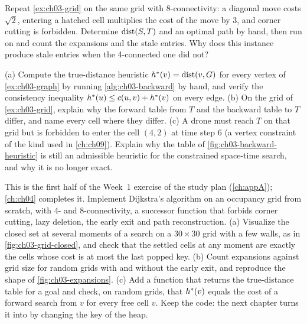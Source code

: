 \begin{exercise}[\difficulty{2}]
\label{exr:ch03-grid8}
Repeat \cref{ex:ch03-grid} on the same grid with 8-connectivity: a diagonal move costs $\sqrt2$,
entering a hatched cell multiplies the cost of the move by 3, and corner cutting is forbidden.
Determine $\operatorname{dist}(S,T)$ and an optimal path by hand, then run  on
 and count the expansions and the stale entries. Why does this
instance produce stale entries when the 4-connected one did not?
\end{exercise}

\begin{exercise}[\difficulty{2}]
\label{exr:ch03-backward}
(a) Compute the true-distance heuristic $h^*(v)=\operatorname{dist}(v,G)$ for every vertex of
\cref{ex:ch03-graph} by running \cref{alg:ch03-backward} by hand, and verify the consistency
inequality $h^*(u)\le c(u,v)+h^*(v)$ on every edge. (b) On the grid of
\cref{ex:ch03-grid}, explain why the forward table from $T$ and the backward table to $T$
differ, and name every cell where they differ. (c) A drone must reach $T$ on that grid but is
forbidden to enter the cell $(4,2)$ at time step 6 (a vertex constraint of the kind used in
\cref{ch:ch09}). Explain why the table of \cref{fig:ch03-backward-heuristic} is still an
admissible heuristic for the constrained space-time search, and why it is no longer exact.
\end{exercise}

\begin{exercise}
\label{exr:ch03-coding}
This is the first half of the Week~1 exercise of the study plan (\cref{ch:appA}); \cref{ch:ch04}
completes it. Implement Dijkstra's algorithm on an occupancy grid from scratch, with 4- and
8-connectivity, a successor function that forbids corner cutting, lazy deletion, the early exit
and path reconstruction. (a) Visualize the closed set at several moments of a search on a
$30\times30$ grid with a few walls, as in \cref{fig:ch03-grid-closed}, and check that the
settled cells at any moment are exactly the cells whose cost is at most the last popped key. (b)
Count expansions against grid size for random grids with and without the early exit, and
reproduce the shape of \cref{fig:ch03-expansions}. (c) Add a function that returns the
true-distance table for a goal and check, on random grids, that $h^*(v)$ equals the cost of
a forward search from $v$ for every free cell $v$. Keep the code: the next chapter turns it into
\astar by changing the key of the heap.
\end{exercise}

